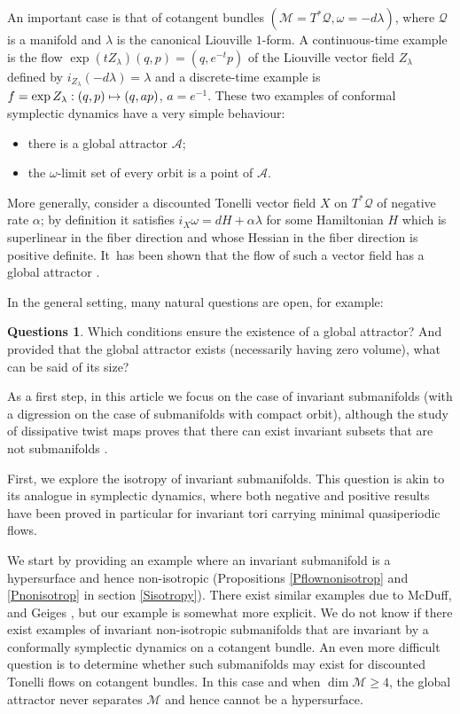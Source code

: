 \documentclass[10pt]{amsart}
\def\mto{\mathchoice{\longmapsto}{\mapsto}{\mapsto}{\mapsto}}
\theoremstyle{definition}
\newtheorem*{questions*}{Questions}
\def\cA{{\mathcal A}}
\def\cM{{\mathcal M}}
\def\cQ{{\mathcal Q}}
\begin{document}
An important case is that of cotangent bundles $(\cM = T^*\cQ, \omega=-d\lambda)$, where $\cQ$ is a manifold and $\lambda$ is the canonical Liouville $1$-form. A continuous-time example is the flow $\exp(tZ_\lambda)(q, p)=(q, e^{-t}p)$ of the Liouville vector field $Z_\lambda$ defined by $i_{Z_\lambda}(-d\lambda)=\lambda$ and
a discrete-time example is $f = \exp Z_\lambda: (q, p) \mto (q, a p)$, $a=e^{-1}$. These two examples of conformal symplectic dynamics have a very simple behaviour:
\begin{itemize}
\item there is a global attractor $\cA$;
\item the $\omega$-limit set of every orbit is a point of $\cA$.
\end{itemize}
More generally, consider a discounted Tonelli vector field $X$ on $T^*\cQ$ of negative rate $\alpha$; by definition it satisfies $i_X\omega = dH + \alpha \lambda$ for some Hamiltonian $H$ which is superlinear in the fiber direction and whose Hessian in the fiber direction is positive definite. It~has been shown that the flow of such a vector field has a global attractor \cite{MarSor2017}.

In the general setting, many natural questions are open, for example:

\begin{questions*}
Which conditions ensure the existence of a global attractor? And provided that the global attractor exists (necessarily having zero volume), what can be said of its size?
\end{questions*}

As a first step, in this article we focus on the case of invariant submanifolds (with a digression on the case of submanifolds with compact orbit), although the study of dissipative twist maps proves that there can exist invariant subsets that are not submanifolds \cite{LeCalvez1988}.

First, we explore the isotropy of invariant submanifolds. This question is akin to its analogue in symplectic dynamics, where both negative and positive results have been proved in particular for invariant tori carrying minimal quasiperiodic flows.

We start by providing an example where an invariant submanifold is a hypersurface and hence non-isotropic (Propositions \ref{Pflownonisotrop} and \ref{Pnonisotrop} in section \ref{Sisotropy}). There exist similar examples due to McDuff, \cite{McDuff1991} and Geiges \cite{Geiges1994,Geiges1995}, but our example is somewhat more explicit. We do not know if there exist examples of invariant non-isotropic submanifolds that are invariant by a conformally symplectic dynamics on a cotangent bundle. An even more difficult question is to determine whether such submanifolds may exist for discounted Tonelli flows on cotangent bundles. In this case and when $\dim \cM\geq 4$, the global attractor never separates $\cM$ and hence cannot be a hypersurface.
\end{document}
